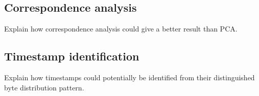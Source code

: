 \documentclass[a4paper]{report}
\begin{document}
\subsection{Correspondence analysis}
Explain how correspondence analysis could give a better result than PCA.

\subsection{Timestamp identification}
Explain how timestamps could potentially be identified from their distinguished
byte distribution pattern.



\end{document}
